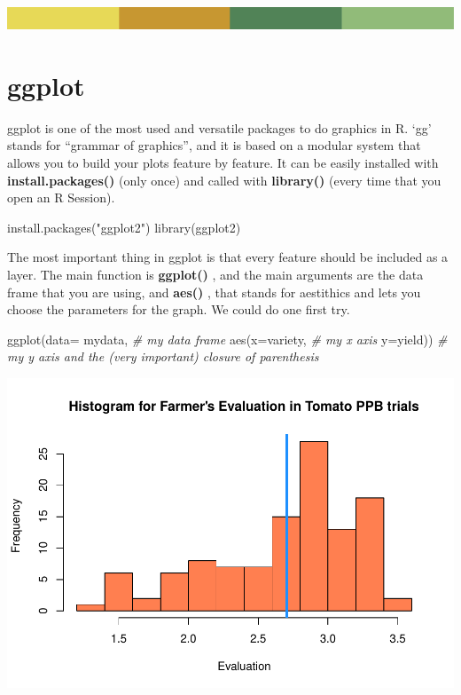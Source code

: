 \documentclass[
]{book}
\newenvironment{Shaded}{\begin{snugshade}}{\end{snugshade}}
\newcommand{\AttributeTok}[1]{\textcolor[rgb]{0.77,0.63,0.00}{#1}}
\newcommand{\CommentTok}[1]{\textcolor[rgb]{0.56,0.35,0.01}{\textit{#1}}}
\newcommand{\FunctionTok}[1]{\textcolor[rgb]{0.00,0.00,0.00}{#1}}
\newcommand{\NormalTok}[1]{#1}
\newcommand{\StringTok}[1]{\textcolor[rgb]{0.31,0.60,0.02}{#1}}
\begin{document}
\includegraphics{rsrstrip.png}

\hypertarget{ggplot}{%
\section{ggplot}\label{ggplot}}

ggplot is one of the most used and versatile packages to do graphics in R. `gg' stands for ``grammar of graphics'', and it is based on a modular system that allows you to build your plots feature by feature. It can be easily installed with \textbf{install.packages() } (only once) and called with \textbf{library() } (every time that you open an R Session).

\begin{Shaded}
\begin{Highlighting}[]
\FunctionTok{install.packages}\NormalTok{(}\StringTok{"ggplot2"}\NormalTok{)}
\FunctionTok{library}\NormalTok{(ggplot2)}
\end{Highlighting}
\end{Shaded}

The most important thing in ggplot is that every feature should be included as a layer. The main function is \textbf{ggplot() }, and the main arguments are the data frame that you are using, and \textbf{aes() }, that stands for aestithics and lets you choose the parameters for the graph. We could do one first try.

\begin{Shaded}
\begin{Highlighting}[]
\FunctionTok{ggplot}\NormalTok{(}\AttributeTok{data=}\NormalTok{ mydata,   }\CommentTok{\# my data frame}
       \FunctionTok{aes}\NormalTok{(}\AttributeTok{x=}\NormalTok{variety,      }\CommentTok{\# my x axis}
           \AttributeTok{y=}\NormalTok{yield))   }\CommentTok{\# my y axis and the (very important) closure of parenthesis}
\end{Highlighting}
\end{Shaded}

\includegraphics{PPB-Toolkit-for-R-and-R-Studio_files/figure-latex/unnamed-chunk-60-1.pdf}
\end{document}
